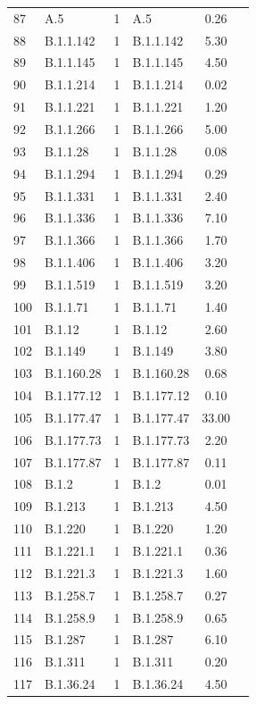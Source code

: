 \documentclass[9pt,twoside,lineno]{pnas-new}
\begin{document}
\begin{longtable}{llcp{4cm}cc}
  87 & A.5 &   1 & A.5 & 0.26 \\ 
  88 & B.1.1.142 &   1 & B.1.1.142 & 5.30 \\ 
  89 & B.1.1.145 &   1 & B.1.1.145 & 4.50 \\ 
  90 & B.1.1.214 &   1 & B.1.1.214 & 0.02 \\ 
  91 & B.1.1.221 &   1 & B.1.1.221 & 1.20 \\ 
  92 & B.1.1.266 &   1 & B.1.1.266 & 5.00 \\ 
  93 & B.1.1.28 &   1 & B.1.1.28 & 0.08 \\ 
  94 & B.1.1.294 &   1 & B.1.1.294 & 0.29 \\ 
  95 & B.1.1.331 &   1 & B.1.1.331 & 2.40 \\ 
  96 & B.1.1.336 &   1 & B.1.1.336 & 7.10 \\ 
  97 & B.1.1.366 &   1 & B.1.1.366 & 1.70 \\ 
  98 & B.1.1.406 &   1 & B.1.1.406 & 3.20 \\ 
  99 & B.1.1.519 &   1 & B.1.1.519 & 3.20 \\ 
  100 & B.1.1.71 &   1 & B.1.1.71 & 1.40 \\ 
  101 & B.1.12 &   1 & B.1.12 & 2.60 \\ 
  102 & B.1.149 &   1 & B.1.149 & 3.80 \\ 
  103 & B.1.160.28 &   1 & B.1.160.28 & 0.68 \\ 
  104 & B.1.177.12 &   1 & B.1.177.12 & 0.10 \\ 
  105 & B.1.177.47 &   1 & B.1.177.47 & 33.00 \\ 
  106 & B.1.177.73 &   1 & B.1.177.73 & 2.20 \\ 
  107 & B.1.177.87 &   1 & B.1.177.87 & 0.11 \\ 
  108 & B.1.2 &   1 & B.1.2 & 0.01 \\ 
  109 & B.1.213 &   1 & B.1.213 & 4.50 \\ 
  110 & B.1.220 &   1 & B.1.220 & 1.20 \\ 
  111 & B.1.221.1 &   1 & B.1.221.1 & 0.36 \\ 
  112 & B.1.221.3 &   1 & B.1.221.3 & 1.60 \\ 
  113 & B.1.258.7 &   1 & B.1.258.7 & 0.27 \\ 
  114 & B.1.258.9 &   1 & B.1.258.9 & 0.65 \\ 
  115 & B.1.287 &   1 & B.1.287 & 6.10 \\ 
  116 & B.1.311 &   1 & B.1.311 & 0.20 \\ 
  117 & B.1.36.24 &   1 & B.1.36.24 & 4.50 \\ 

\end{longtable}
\end{document}
